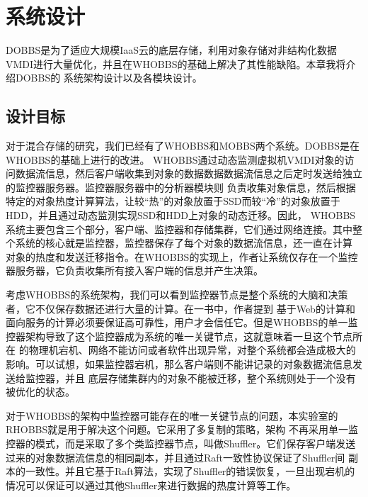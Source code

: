 
\chapter{系统设计}
\label{chap:systemdesign}
DOBBS是为了适应大规模IaaS云的底层存储，利用对象存储对非结构化数据VMDI进行大量优化，并且在WHOBBS的基础上解决了其性能缺陷。本章我将介绍DOBBS的
系统架构设计以及各模块设计。

\section{设计目标}
对于混合存储的研究，我们已经有了WHOBBS\cite{lingxuan2015whobbs}和MOBBS\cite{ma2014mobbs}两个系统。DOBBS是在WHOBBS的基础上进行的改进。
WHOBBS通过动态监测虚拟机VMDI对象的访问数据流信息，然后客户端收集到对象的数据数据数据流信息之后定时发送给独立的监控器服务器。监控器服务器中的分析器模块则
负责收集对象信息，然后根据特定的对象热度计算算法，让较“热”的对象放置于SSD而较“冷”的对象放置于HDD，并且通过动态监测实现SSD和HDD上对象的动态迁移。因此，
WHOBBS系统主要包含三个部分，客户端、监控器和存储集群，它们通过网络连接。其中整个系统的核心就是监控器，监控器保存了每个对象的数据流信息，还一直在计算
对象的热度和发送迁移指令。在WHOBBS的实现上，作者让系统仅存在一个监控器服务器，它负责收集所有接入客户端的信息并产生决策。

考虑WHOBBS的系统架构，我们可以看到监控器节点是整个系统的大脑和决策者，它不仅保存数据还进行大量的计算。在一书中，作者提到
基于Web的计算和面向服务的计算必须要保证高可靠性，用户才会信任它。但是WHOBBS的单一监控器架构导致了这个监控器成为系统的唯一关键节点，这就意味着一旦这个节点所在
的物理机宕机、网络不能访问或者软件出现异常，对整个系统都会造成极大的影响。可以试想，如果监控器宕机，那么客户端则不能讲记录的对象数据流信息发送给监控器，并且
底层存储集群内的对象不能被迁移，整个系统则处于一个没有被优化的状态。

对于WHOBBS的架构中监控器可能存在的唯一关键节点的问题，本实验室的RHOBBS\cite{zhenwang2016rhobbs}就是用于解决这个问题。它采用了多复制的策略，架构
不再采用单一监控器的模式，而是采取了多个类监控器节点，叫做Shuffler。它们保存客户端发送过来的对象数据流信息的相同副本，并且通过Raft一致性协议保证了Shuffler间
副本的一致性。并且它基于Raft算法，实现了Shuffler的错误恢复，一旦出现宕机的情况可以保证可以通过其他Shuffler来进行数据的热度计算等工作。

